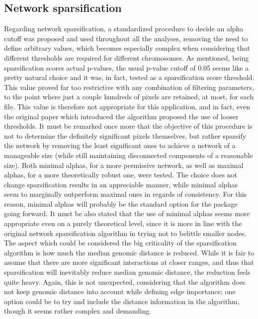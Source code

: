\subsection{Network sparsification}
Regarding network sparsification, a standardized procedure to decide an alpha cutoff was proposed and used throughout all the analyses, removing the need to define arbitrary values, which becomes especially complex when considering that different thresholds are required for different chromosomes. As mentioned, being sparsification scores actual p-values, the usual p-value cutoff of 0.05 seems like a pretty natural choice and it was, in fact, tested as a sparsification score threshold. This value proved far too restrictive with any combination of filtering parameters, to the point where just a couple hundreds of pixels are retained, at most, for each file. This value is therefore not appropriate for this application, and in fact, even the original paper which introduced the algorithm proposed the use of looser thresholds. It must be remarked once more that the objective of this procedure is not to determine the definitely significant pixels themselves, but rather sparsify the network by removing the least significant ones to achieve a network of a manageable size (while still maintaining disconnected components of a reasonable size). Both minimal alphas, for a more permissive network, as well as maximal alphas, for a more theoretically robust one, were tested. The choice does not change sparsification results in an appreciable manner, while minimal alphas seem to marginally outperform maximal ones in regards of consistency. For this reason, minimal alphas will probably be the standard option for the package going forward. It must be also stated that the use of minimal alphas seems more appropriate even on a purely theoretical level, since it is more in line with the original network sparsification algorithm in trying not to belittle smaller nodes. The aspect which could be considered the big criticality of the sparsification algorithm is how much the median genomic distance is reduced. While it is fair to assume that there are more significant interactions at closer ranges, and thus that sparsification will inevitably reduce median genomic distance, the reduction feels quite heavy. Again, this is not unexpected, considering that the algorithm does not keep genomic distance into account while defining edge importance; one option could be to try and include the distance information in the algorithm, though it seems rather complex and demanding.


